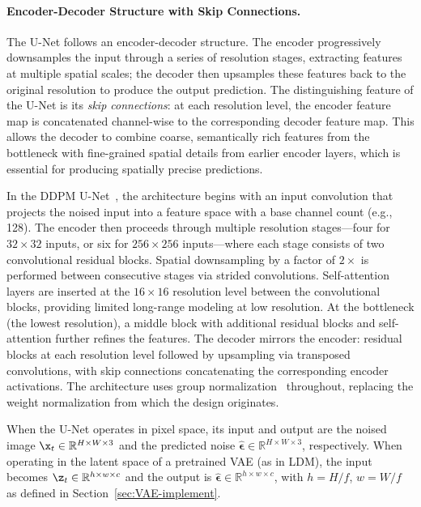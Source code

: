 \documentclass[../../book-main.tex]{subfiles}
\begin{document}
\paragraph{Encoder-Decoder Structure with Skip Connections.}
The U-Net follows an encoder-decoder structure. The encoder
progressively downsamples the input through a series of resolution
stages, extracting features at multiple spatial scales; the decoder
then upsamples these features back to the original resolution to
produce the output prediction. The distinguishing feature of the
U-Net is its \emph{skip connections}: at each resolution level, the
encoder feature map is concatenated channel-wise to the corresponding
decoder feature map. This allows the decoder to combine coarse,
semantically rich features from the bottleneck with fine-grained
spatial details from earlier encoder layers, which is essential for
producing spatially precise predictions.

In the DDPM U-Net~\citep{ho2020denoising}, the architecture begins
with an input convolution that projects the noised input into a
feature space with a base channel count (e.g., 128). The encoder then
proceeds through multiple resolution stages---four for $32 \times 32$
inputs, or six for $256 \times 256$ inputs---where each stage
consists of two convolutional residual blocks. Spatial downsampling
by a factor of $2\times$ is performed between consecutive stages via
strided convolutions. Self-attention layers are inserted at the $16
\times 16$ resolution level between the convolutional blocks,
providing limited long-range modeling at low resolution. At the
bottleneck (the lowest resolution), a middle block with additional
residual blocks and self-attention further refines the features. The
decoder mirrors the encoder: residual blocks at each resolution level
followed by upsampling via transposed convolutions, with skip
connections concatenating the corresponding encoder activations. The
architecture uses group normalization~\citep{wu2018group} throughout,
replacing the weight normalization from which the design originates.

When the U-Net operates in pixel space, its input and output are the
noised image $\x_t \in \mathbb{R}^{H \times W \times 3}$ and the
predicted noise $\hat{\boldsymbol{\epsilon}} \in \mathbb{R}^{H \times
W \times 3}$, respectively. When operating in the latent space of a
pretrained VAE (as in LDM), the input becomes $\z_t \in \mathbb{R}^{h
\times w \times c}$ and the output is $\hat{\boldsymbol{\epsilon}}
\in \mathbb{R}^{h \times w \times c}$, with $h = H/f$, $w = W/f$ as
defined in Section~\ref{sec:VAE-implement}.
\end{document}
